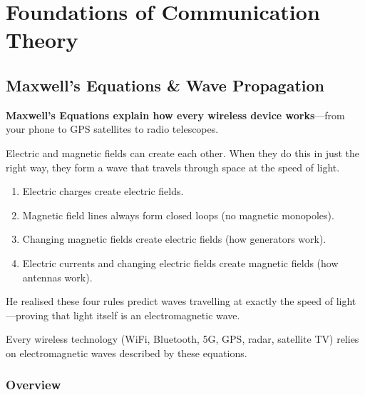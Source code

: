
\chapter{Foundations of Communication Theory} %
\label{ch:foundations}

\section{Maxwell's Equations \& Wave Propagation}
\label{sec:maxwell}

\begin{nontechnical}
    \textbf{Maxwell's Equations explain how every wireless device works}---from your phone to GPS satellites to radio telescopes.

     Electric and magnetic fields can create each other. When they do this in just the right way, they form a wave that travels through space at the speed of light.

    \begin{enumerate}[label=\arabic*.]
        \item Electric charges create electric fields.
        \item Magnetic field lines always form closed loops (no magnetic monopoles).
        \item Changing magnetic fields create electric fields (how generators work).
        \item Electric currents and changing electric fields create magnetic fields (how antennas work).
    \end{enumerate}

     He realised these four rules predict waves travelling at exactly the speed of light---proving that light itself is an electromagnetic wave.

     Every wireless technology (WiFi, Bluetooth, 5G, GPS, radar, satellite TV) relies on electromagnetic waves described by these equations.
\end{nontechnical}

\subsection{Overview}

